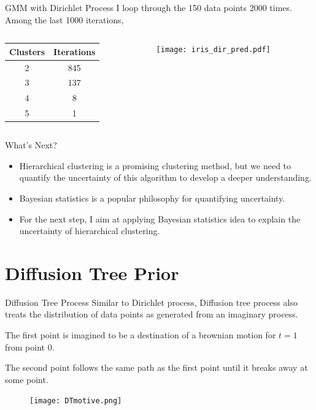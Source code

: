 \documentclass{beamer}
\begin{document}
	\begin{frame}{GMM with Dirichlet Process}
		I loop through the 150 data points 2000 times. Among the last 1000 iterations,
		\begin{columns}
			\begin{column}{0.3\textwidth}
				
				\begin{table}[htbp]
					\small
					\centering
					\begin{tabular}{cc}
						\toprule
						Clusters & Iterations\\
						\midrule
						2 & 845\\
						3 & 137 \\
						4& 8 \\
						5& 1\\
						\bottomrule
					\end{tabular}
				\end{table}
			\end{column}
			\begin{column}{0.7\textwidth}
				\begin{figure}[htbp]
					\centering
					\texttt{[image: iris\_dir\_pred.pdf]}
				\end{figure}
			\end{column}
		\end{columns} 
	\end{frame}

	\begin{frame}{What's Next?}
		\begin{itemize}
			\item Hierarchical clustering is a promising clustering method, but we need to quantify the uncertainty of this algorithm to develop a deeper understanding.
			\item Bayesian statistics is a popular philosophy for quantifying uncertainty.
			\item For the next step, I aim at applying Bayesian statistics idea to explain the uncertainty of hierarchical clustering.
		\end{itemize}
	\end{frame}

	\section{Diffusion Tree Prior}
	\begin{frame}{Diffusion Tree Process}
	\small
			Similar to Dirichlet process, Diffusion tree process also treats the distribution of data points as generated from an imaginary process.

The first point is imagined to be a destination of a brownian motion for $t=1$ from point 0.

The second point follows the same path as the first point until it breaks away at some point.

			\begin{figure}[htbp]
				\centering
				\texttt{[image: DTmotive.png]}
			\end{figure}
	\end{frame}
\end{document}
